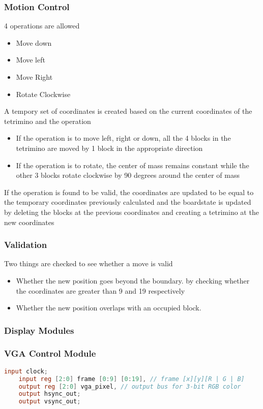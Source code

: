 \subsubsection{Motion Control }
\label{subsubsection:motioncontrol}
4 operations are allowed
\begin{itemize}
    \item Move down
    \item Move left
    \item Move Right
    \item Rotate Clockwise
\end{itemize}
 A tempory set of coordinates is created based on the current coordinates of the tetrimino and the operation 
 \begin{itemize}
     \item If the operation is to move left, right or down, all the 4 blocks in the tetrimino are moved by 1 block in the appropriate direction
     \item If the operation is to rotate, the center of mass remains constant while the other 3 blocks rotate clockwise by 90 degrees around the center of mass
 \end{itemize}
 If the operation is found to be valid, the coordinates are updated to
 be equal to the temporary coordinates previously calculated and the boardstate is updated by deleting the blocks at the previous coordinates
 and creating a tetrimino at the new coordinates

\subsubsection{Validation }
\label{subsubsection:validation}
Two things are checked to see whether a move is valid 
\begin{itemize}
    \item Whether the new position goes beyond the boundary. 
    by checking  whether the coordinates are greater than 9 and 19 respectively
    \item Whether the new position overlaps with an occupied block. 
   
\end{itemize}

\subsubsection{Display Modules}
\label{subsection:display}

\subsubsection{VGA Control Module}
\label{subsubsection:vgacontrol}
%
\begin{lstlisting}[language=Verilog]
    input clock;
    input reg [2:0] frame [0:9] [0:19], // frame [x][y][R | G | B]
    output reg [2:0] vga_pixel, // output bus for 3-bit RGB color
    output hsync_out;
    output vsync_out;
\end{lstlisting}
 

